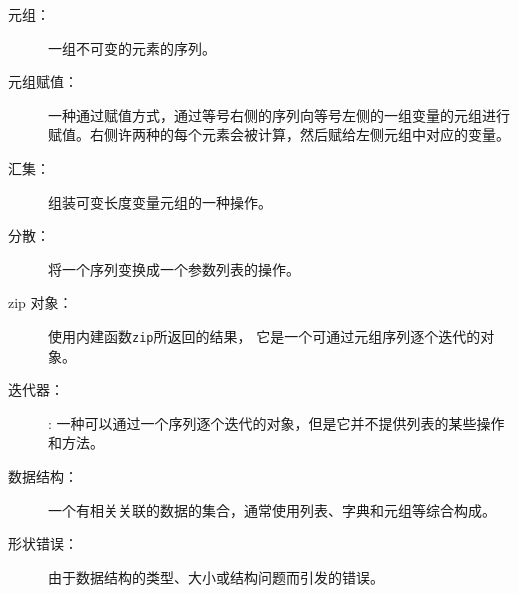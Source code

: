 \begin{description}


\item[元组：] 一组不可变的元素的序列。


\item[元组赋值：]一种通过赋值方式，通过等号右侧的序列向等号左侧的一组变量的元组进行赋值。右侧许两种的每个元素会被计算，然后赋给左侧元组中对应的变量。
 


\item[汇集：] 组装可变长度变量元组的一种操作。


\item[分散：] 将一个序列变换成一个参数列表的操作。



\item[zip 对象：] 使用内建函数\lstinline{zip}所返回的结果， 它是一个可通过元组序列逐个迭代的对象。
 


\item[迭代器：]: 一种可以通过一个序列逐个迭代的对象，但是它并不提供列表的某些操作和方法。


\item[数据结构：] 一个有相关关联的数据的集合，通常使用列表、字典和元组等综合构成。


\item[形状错误：] 由于数据结构的类型、大小或结构问题而引发的错误。

\end{description}


